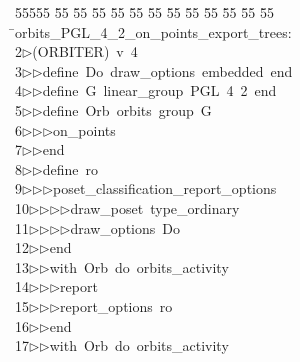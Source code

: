 %
%
\begin{tabbing}
55555 \= 55 \= 55 \= 55 \= 55 \= 55 \= 55 \= 55 \= 55 \= 55 \= 55 \= 55 \= 55 \= \>orbits\_PGL\_4\_2\_on\_points\_export\_trees:\\[0pt]
2\>$\triangleright$\>(ORBITER)\ v\ 4\ \\[0pt]
3\>$\triangleright$\>$\triangleright$\>define\ Do\ draw\_options\ embedded\ end\ \\[0pt]
4\>$\triangleright$\>$\triangleright$\>define\ G\ linear\_group\ PGL\ 4\ 2\ end\ \\[0pt]
5\>$\triangleright$\>$\triangleright$\>define\ Orb\ orbits\ group\ G\ \\[0pt]
6\>$\triangleright$\>$\triangleright$\>$\triangleright$\>on\_points\ \\[0pt]
7\>$\triangleright$\>$\triangleright$\>end\ \\[0pt]
8\>$\triangleright$\>$\triangleright$\>define\ ro\ \\[0pt]
9\>$\triangleright$\>$\triangleright$\>$\triangleright$\>poset\_classification\_report\_options\ \\[0pt]
10\>$\triangleright$\>$\triangleright$\>$\triangleright$\>$\triangleright$\>draw\_poset\ type\_ordinary\ \\[0pt]
11\>$\triangleright$\>$\triangleright$\>$\triangleright$\>$\triangleright$\>draw\_options\ Do\ \\[0pt]
12\>$\triangleright$\>$\triangleright$\>end\ \\[0pt]
13\>$\triangleright$\>$\triangleright$\>with\ Orb\ do\ orbits\_activity\ \\[0pt]
14\>$\triangleright$\>$\triangleright$\>$\triangleright$\>report\ \ \\[0pt]
15\>$\triangleright$\>$\triangleright$\>$\triangleright$\>report\_options\ ro\ \\[0pt]
16\>$\triangleright$\>$\triangleright$\>end\ \\[0pt]
17\>$\triangleright$\>$\triangleright$\>with\ Orb\ do\ orbits\_activity\ \\[0pt]

\end{tabbing}
